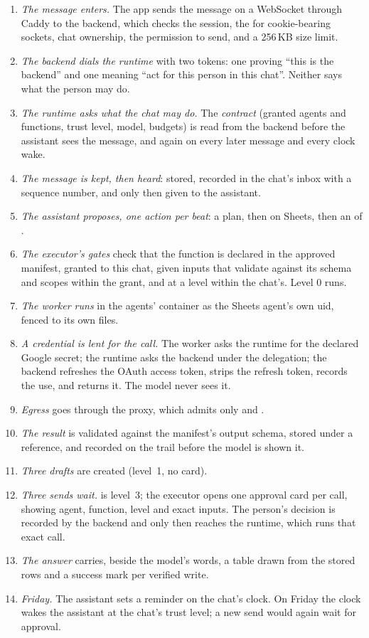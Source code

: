 \begin{enumerate}[leftmargin=1.4em]
\item \emph{The message enters.} The app sends the message on a
  WebSocket through Caddy to the backend, which checks the session,
  the  for cookie-bearing sockets, chat ownership, the
  permission to send, and a 256\,KB size limit.
\item \emph{The backend dials the runtime} with two tokens: one proving
  ``this is the backend'' and one meaning ``act for this person in this
  chat''. Neither says what the person may do.
\item \emph{The runtime asks what the chat may do.} The \emph{contract}
  (granted agents and functions, trust level, model, budgets) is read
  from the backend before the assistant sees the message, and again on
  every later message and every clock wake.
\item \emph{The message is kept, then heard}: stored, recorded in the
  chat's inbox with a sequence number, and only then given to the
  assistant.
\item \emph{The assistant proposes, one action per beat}: a plan, then
   on Sheets, then an  of
  .
\item \emph{The executor's gates} check that the function is declared
  in the approved manifest, granted to this chat, given inputs that
  validate against its schema and scopes within the grant, and at a
  level within the chat's. Level 0 runs.
\item \emph{The worker runs} in the agents' container as the Sheets
  agent's own uid, fenced to its own files.
\item \emph{A credential is lent for the call.} The worker asks the
  runtime for the declared Google secret; the runtime asks the backend
  under the delegation; the backend refreshes the OAuth access token,
  strips the refresh token, records the use, and returns it. The model
  never sees it.
\item \emph{Egress} goes through the proxy, which admits only
   and .
\item \emph{The result} is validated against the manifest's output
  schema, stored under a reference, and recorded on the trail before
  the model is shown it.
\item \emph{Three drafts} are created (level~1, no card).
\item \emph{Three sends wait.}  is level~3; the
  executor opens one approval card per call, showing agent, function,
  level and exact inputs. The person's decision is recorded by the
  backend and only then reaches the runtime, which runs that exact call.
\item \emph{The answer} carries, beside the model's words, a table drawn
  from the stored rows and a success mark per verified write.
\item \emph{Friday.} The assistant sets a reminder on the chat's clock.
  On Friday the clock wakes the assistant at the chat's trust level; a
  new send would again wait for approval.
\end{enumerate}

